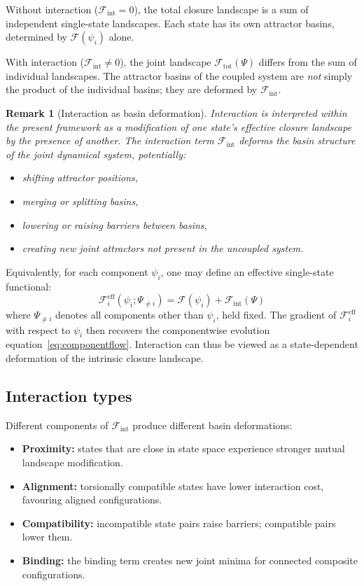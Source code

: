 \documentclass[12pt]{article}
\newtheorem{remark}[theorem]{Remark}
\newcommand{\Fcal}{\mathcal{F}}
\newcommand{\Fint}{\Fcal_{\mathrm{int}}}
\newcommand{\Ftot}{\Fcal_{\mathrm{tot}}}
\begin{document}
Without interaction ($\Fint = 0$), the total closure landscape is a sum of independent single-state landscapes. Each state has its own attractor basins, determined by $\Fcal(\psi_i)$ alone.

With interaction ($\Fint \neq 0$), the joint landscape $\Ftot(\Psi)$ differs from the sum of individual landscapes. The attractor basins of the coupled system are \textit{not} simply the product of the individual basins; they are deformed by $\Fint$.

\begin{remark}[Interaction as basin deformation]
Interaction is interpreted within the present framework as a modification of one state's effective closure landscape by the presence of another. The interaction term $\Fint$ deforms the basin structure of the joint dynamical system, potentially:
\begin{itemize}
    \item shifting attractor positions,
    \item merging or splitting basins,
    \item lowering or raising barriers between basins,
    \item creating new joint attractors not present in the uncoupled system.
\end{itemize}
\end{remark}

Equivalently, for each component $\psi_i$, one may define an effective single-state functional:
\begin{equation}
    \Fcal_i^{\mathrm{eff}}(\psi_i; \Psi_{\neq i}) = \Fcal(\psi_i) + \Fint(\Psi)
\end{equation}
where $\Psi_{\neq i}$ denotes all components other than $\psi_i$, held fixed. The gradient of $\Fcal_i^{\mathrm{eff}}$ with respect to $\psi_i$ then recovers the componentwise evolution equation~\eqref{eq:componentflow}. Interaction can thus be viewed as a state-dependent deformation of the intrinsic closure landscape.

\subsection{Interaction types}

Different components of $\Fint$ produce different basin deformations:
\begin{itemize}
    \item \textbf{Proximity:} states that are close in state space experience stronger mutual landscape modification.
    \item \textbf{Alignment:} torsionally compatible states have lower interaction cost, favouring aligned configurations.
    \item \textbf{Compatibility:} incompatible state pairs raise barriers; compatible pairs lower them.
    \item \textbf{Binding:} the binding term creates new joint minima for connected composite configurations.
\end{itemize}
\end{document}
